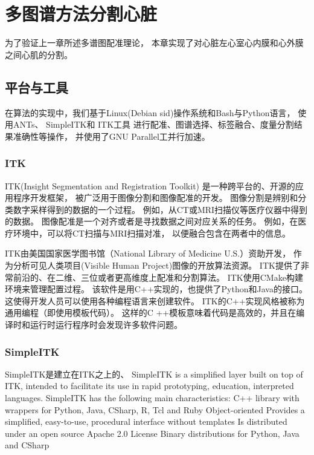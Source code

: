 
\chapter{多图谱方法分割心脏}
为了验证上一章所述多谱图配准理论，
本章实现了对心脏左心室心内膜和心外膜之间心肌的分割。

\section{平台与工具}
在算法的实现中，我们基于Linux(Debian sid)操作系统和Bash与Python语言，
使用ANTs、
SimpleITK和
ITK工具
进行配准、图谱选择、标签融合、度量分割结果准确性等操作，
并使用了GNU Parallel工并行加速。

\subsection{ITK}
ITK(Insight Segmentation and Registration Toolkit)
是一种跨平台的、开源的应用程序开发框架，
被广泛用于图像分割和图像配准的开发。
图像分割是辨别和分类数字采样得到的数据的一个过程。
例如，从CT或MRI扫描仪等医疗仪器中得到的数据。
图像配准是一个对齐或者是寻找数据之间对应关系的任务。
例如，在医疗环境中，可以将CT扫描与MRI扫描对准，
以便融合包含在两者中的信息。

ITK由美国国家医学图书馆（National Library of Medicine U.S.）资助开发，
作为分析可见人类项目(Visible Human Project)图像的开放算法资源。
ITK提供了非常前沿的、在二维、三位或者更高维度上配准和分割算法。
ITK使用CMake构建环境来管理配置过程。
该软件是用C++实现的，也提供了Python和Java的接口。
这使得开发人员可以使用各种编程语言来创建软件。
ITK的C++实现风格被称为通用编程（即使用模板代码）。
这样的C ++模板意味着代码是高效的，并且在编译时和运行时运行程序时会发现许多软件问题。
\subsection{SimpleITK}
SimpleITK是建立在ITK之上的、
 SimpleITK is a simplified layer built on top of ITK, intended to facilitate its use in rapid prototyping, education, interpreted languages. SimpleITK has the following main characteristics:
C++ library with wrappers for Python, Java, CSharp, R, Tcl and Ruby
Object-oriented
Provides a simplified, easy-to-use, procedural interface without templates
Is distributed under an open source Apache 2.0 License
Binary distributions for Python, Java and CSharp

